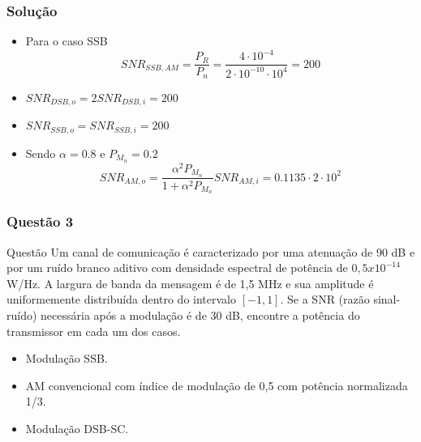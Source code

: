 \documentclass[aspectratio=169,dvipsnames]{beamer}
\begin{document}
\begin{frame}
  \frametitle{Solução}
  \begin{itemize} 
    \item Para o caso SSB
  \begin{equation*}
    SNR_{SSB,AM} = \frac{P_R}{P_n} = \frac{4\cdot 10^{-4}}{2 \cdot 10^{-10} \cdot 10^4} = 200
    \end{equation*}
  
    \item $SNR_{DSB,o} = 2 SNR_{DSB,i} = 200 $
    \item $SNR_{SSB,o} = SNR_{SSB,i} = 200 $
    \item Sendo $\alpha = 0.8$ e $P_{M_n} = 0.2$ 
    \begin{equation}
      SNR_{AM,o} = \frac{\alpha^2 P_{M_n}}{1 + \alpha^2 P_{M_n}}SNR_{AM,i} = 0.1135 \cdot 2 \cdot 10^2
      \end{equation}
  \end{itemize}  

\end{frame}


\begin{frame}
  \frametitle{Questão 3}

  \begin{block}{Questão}
    Um canal de comunicação é caracterizado por uma atenuação de 90 dB e 
    por um ruído branco aditivo com densidade espectral de potência de 
    $0,5 x 10^{-14}$ W/Hz. A largura de banda da mensagem é de 1,5 MHz e 
    sua amplitude é uniformemente distribuída dentro do intervalo $[-1,1]$. 
    Se a SNR (razão sinal-ruído) necessária após a modulação é de 30 dB, 
    encontre a potência do transmissor em cada um dos casos.

    \begin{itemize}
      \item Modulação SSB.
      \item AM convencional com índice de modulação de 0,5 com potência normalizada 1/3.
      \item Modulação DSB-SC.
    \end{itemize}

  \end{block}

\end{frame}
\end{document}
